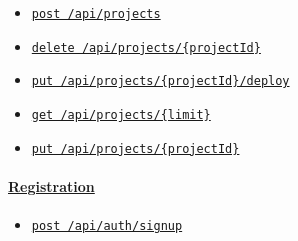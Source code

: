 {\begin{itemize}
\tightlist
\item
  \protect\hyperlink{createProject}{\texttt{post\ /api/projects}}
\item
  \protect\hyperlink{deleteProject}{\texttt{delete\ /api/projects/\{projectId\}}}
\item
  \protect\hyperlink{deployProject}{\texttt{put\ /api/projects/\{projectId\}/deploy}}
\item
  \protect\hyperlink{getProjects}{\texttt{get\ /api/projects/\{limit\}}}
\item
  \protect\hyperlink{updateProjectMetadata}{\texttt{put\ /api/projects/\{projectId\}}}
\end{itemize}

\hypertarget{registration}{%
\paragraph{\texorpdfstring{\protect\hyperlink{Registration}{Registration}}{Registration}}\label{registration}}

\begin{itemize}
\tightlist
\item
  \protect\hyperlink{signUp}{\texttt{post\ /api/auth/signup}}
\end{itemize}
}